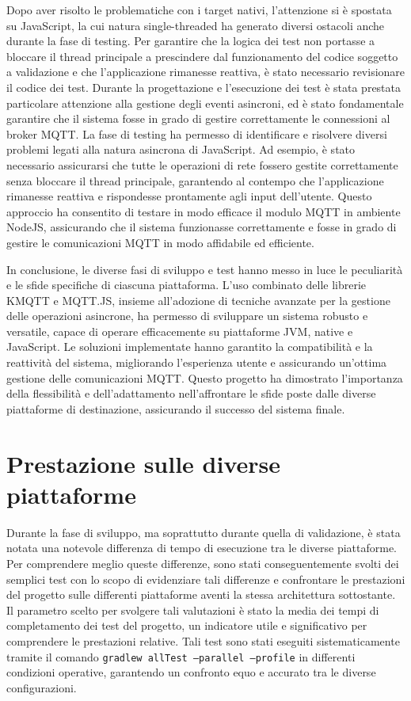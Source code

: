 \documentclass[12pt,a4paper,openright,twoside]{book}
\begin{document}
Dopo aver risolto le problematiche con i target nativi, l'attenzione si è spostata su JavaScript, la cui natura single-threaded ha generato diversi ostacoli anche durante 
la fase di testing. Per garantire che la logica dei test non portasse a bloccare il thread principale a prescindere dal funzionamento del codice soggetto a validazione e che 
l'applicazione rimanesse reattiva, è stato necessario revisionare il codice dei test. Durante la progettazione e l'esecuzione dei test è stata prestata particolare attenzione 
alla gestione degli eventi asincroni, ed è stato fondamentale garantire che il sistema fosse in grado di gestire correttamente le connessioni al broker \ac{MQTT}. 
La fase di testing ha permesso di identificare e risolvere diversi problemi legati alla natura asincrona di JavaScript. Ad esempio, è stato necessario assicurarsi 
che tutte le operazioni di rete fossero gestite correttamente senza bloccare il thread principale, garantendo al contempo che l'applicazione rimanesse reattiva 
e rispondesse prontamente agli input dell'utente. Questo approccio ha consentito di testare in modo efficace il modulo \ac{MQTT} in ambiente NodeJS, 
assicurando che il sistema funzionasse correttamente e fosse in grado di gestire le comunicazioni \ac{MQTT} in modo affidabile ed efficiente.

In conclusione, le diverse fasi di sviluppo e test hanno messo in luce le peculiarità e le sfide specifiche di ciascuna piattaforma. 
L'uso combinato delle librerie KMQTT e MQTT.JS, insieme all'adozione di tecniche avanzate per la gestione delle operazioni asincrone, 
ha permesso di sviluppare un sistema robusto e versatile, capace di operare efficacemente su piattaforme \ac{JVM}, native e JavaScript. 
Le soluzioni implementate hanno garantito la compatibilità e la reattività del sistema, migliorando l'esperienza utente e assicurando un'ottima gestione 
delle comunicazioni \ac{MQTT}. Questo progetto ha dimostrato l'importanza della flessibilità e dell'adattamento nell'affrontare le sfide poste dalle diverse 
piattaforme di destinazione, assicurando il successo del sistema finale.

\pagebreak
\section{Prestazione sulle diverse piattaforme}

Durante la fase di sviluppo, ma soprattutto durante quella di validazione, è stata notata una notevole differenza di tempo di esecuzione tra le diverse piattaforme. 
Per comprendere meglio queste differenze, sono stati conseguentemente svolti dei semplici test con lo scopo di evidenziare tali differenze e confrontare le prestazioni 
del progetto sulle differenti piattaforme aventi la stessa architettura sottostante. Il parametro scelto per svolgere tali valutazioni è stato la media dei tempi di completamento 
dei test del progetto, un indicatore utile e significativo per comprendere le prestazioni relative. Tali test sono stati eseguiti sistematicamente tramite il comando 
\texttt{gradlew allTest --parallel --profile} in differenti condizioni operative, garantendo un confronto equo e accurato tra le diverse configurazioni.
\end{document}
